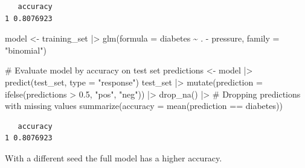 \documentclass[
  letterpaper,
  DIV=11,
  numbers=noendperiod]{scrreprt}
\newenvironment{Shaded}{\begin{snugshade}}{\end{snugshade}}
\newcommand{\AttributeTok}[1]{\textcolor[rgb]{0.40,0.45,0.13}{#1}}
\newcommand{\CommentTok}[1]{\textcolor[rgb]{0.37,0.37,0.37}{#1}}
\newcommand{\FloatTok}[1]{\textcolor[rgb]{0.68,0.00,0.00}{#1}}
\newcommand{\FunctionTok}[1]{\textcolor[rgb]{0.28,0.35,0.67}{#1}}
\newcommand{\NormalTok}[1]{\textcolor[rgb]{0.00,0.23,0.31}{#1}}
\newcommand{\OtherTok}[1]{\textcolor[rgb]{0.00,0.23,0.31}{#1}}
\newcommand{\SpecialCharTok}[1]{\textcolor[rgb]{0.37,0.37,0.37}{#1}}
\newcommand{\StringTok}[1]{\textcolor[rgb]{0.13,0.47,0.30}{#1}}
\begin{document}
\begin{verbatim}
   accuracy
1 0.8076923
\end{verbatim}

\begin{Shaded}
\begin{Highlighting}[]
\NormalTok{model }\OtherTok{\textless{}{-}}\NormalTok{ training\_set }\SpecialCharTok{|\textgreater{}} 
  \FunctionTok{glm}\NormalTok{(}\AttributeTok{formula =}\NormalTok{ diabetes }\SpecialCharTok{\textasciitilde{}}\NormalTok{ . }\SpecialCharTok{{-}}\NormalTok{ pressure, }\AttributeTok{family =} \StringTok{"binomial"}\NormalTok{)}

\CommentTok{\# Evaluate model by accuracy on test set}
\NormalTok{predictions }\OtherTok{\textless{}{-}}\NormalTok{ model }\SpecialCharTok{|\textgreater{}} 
  \FunctionTok{predict}\NormalTok{(test\_set, }\AttributeTok{type =} \StringTok{"response"}\NormalTok{)}
\NormalTok{test\_set }\SpecialCharTok{|\textgreater{}} 
  \FunctionTok{mutate}\NormalTok{(}\AttributeTok{prediction =} \FunctionTok{ifelse}\NormalTok{(predictions }\SpecialCharTok{\textgreater{}} \FloatTok{0.5}\NormalTok{, }\StringTok{"pos"}\NormalTok{, }\StringTok{"neg"}\NormalTok{)) }\SpecialCharTok{|\textgreater{}} 
  \FunctionTok{drop\_na}\NormalTok{() }\SpecialCharTok{|\textgreater{}} \CommentTok{\# Dropping predictions with missing values}
  \FunctionTok{summarize}\NormalTok{(}\AttributeTok{accuracy =} \FunctionTok{mean}\NormalTok{(prediction }\SpecialCharTok{==}\NormalTok{ diabetes))}
\end{Highlighting}
\end{Shaded}

\begin{verbatim}
   accuracy
1 0.8076923
\end{verbatim}

With a different seed the full model has a higher accuracy.
\end{document}
